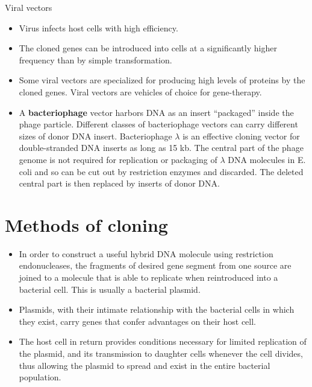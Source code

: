 \documentclass[11pt,dvipsnames,ignorenonframetext,aspectratio=169]{beamer}
\providecommand{\tightlist}{%
  \setlength{\itemsep}{0pt}\setlength{\parskip}{0pt}}
\begin{document}
\begin{frame}{Viral vectors}
\protect\hypertarget{viral-vectors}{}

\begin{itemize}
\tightlist
\item
  Virus infects host cells with high efficiency.
\item
  The cloned genes can be introduced into cells at a significantly
  higher frequency than by simple transformation.
\item
  Some viral vectors are specialized for producing high levels of
  proteins by the cloned genes. Viral vectors are vehicles of choice for
  gene-therapy.
\item
  A \textbf{bacteriophage} vector harbors DNA as an insert ``packaged''
  inside the phage particle. Different classes of bacteriophage vectors
  can carry different sizes of donor DNA insert. Bacteriophage
  \(\lambda\) is an effective cloning vector for double-stranded DNA
  inserts as long as 15 kb. The central part of the phage genome is not
  required for replication or packaging of \(\lambda\) DNA molecules in
  E. coli and so can be cut out by restriction enzymes and discarded.
  The deleted central part is then replaced by inserts of donor DNA.
\end{itemize}

\end{frame}

\hypertarget{methods-of-cloning}{%
\section{Methods of cloning}\label{methods-of-cloning}}

\begin{frame}{}
\protect\hypertarget{section-24}{}

\begin{itemize}
\tightlist
\item
  In order to construct a useful hybrid DNA molecule using restriction
  endonucleases, the fragments of desired gene segment from one source
  are joined to a molecule that is able to replicate when reintroduced
  into a bacterial cell. This is usually a bacterial plasmid.
\item
  Plasmids, with their intimate relationship with the bacterial cells in
  which they exist, carry genes that confer advantages on their host
  cell.
\item
  The host cell in return provides conditions necessary for limited
  replication of the plasmid, and its transmission to daughter cells
  whenever the cell divides, thus allowing the plasmid to spread and
  exist in the entire bacterial population.
\end{itemize}

\end{frame}
\end{document}
